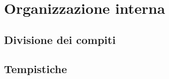 \section{Organizzazione interna}
    \subsection{Divisione dei compiti}
    \subsection{Tempistiche}

